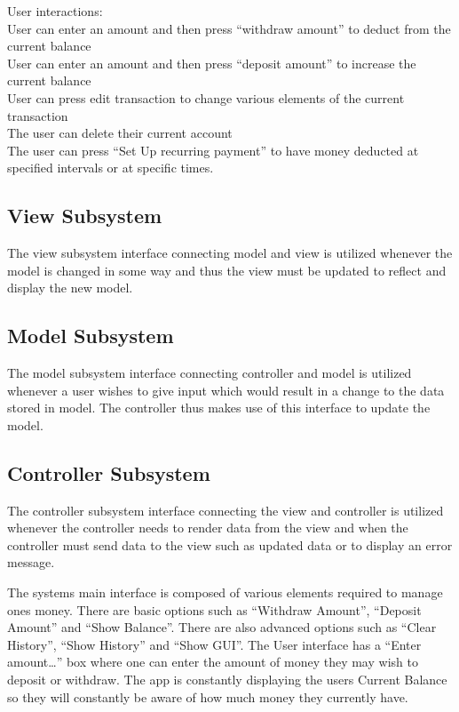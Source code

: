 \documentclass[12pt]{article}
\begin{document}
User interactions:\\
User can enter an amount and then press “withdraw amount” to deduct from the current balance\\
User can enter an amount and then press “deposit amount” to increase the current balance\\
User can press edit transaction to change various elements of the current transaction\\
The user can delete their current account\\
The user can press “Set Up recurring payment” to have money deducted at specified intervals or at specific times.\\


\subsection{View Subsystem}
The view subsystem interface connecting model and view is utilized whenever the model is changed in some way and thus the view must be updated to reflect and display the new model.

\subsection{Model Subsystem}
The model subsystem interface connecting controller and model is utilized whenever a user wishes to give input which would result in a change to the data stored in model. The controller thus makes use of this interface to update the model.

\subsection{Controller Subsystem}
The controller subsystem interface connecting the view and controller is utilized whenever the controller needs to render data from the view and when the controller must send data to the view such as updated data or to display an error message.

The systems main interface is composed of various elements required to manage ones money.
There are basic options such as “Withdraw Amount”, “Deposit Amount” and “Show Balance”. There are also advanced options such as “Clear History”, “Show History” and “Show GUI”. The User interface has a “Enter amount…” box where one can enter the amount of money they may wish to deposit or withdraw. The app is constantly displaying the users Current Balance so they will constantly be aware of how much money they currently have.\\
\end{document}
